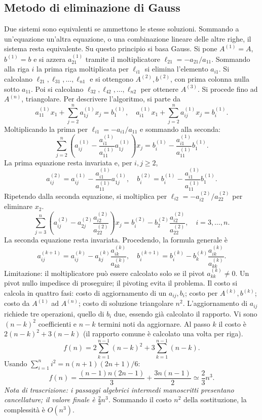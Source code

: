 \documentclass[11pt,a4paper]{article}
\newcommand{\pagina}[1]{\clearpage}
\begin{document}
\subsection*{Metodo di eliminazione di Gauss}
Due sistemi sono equivalenti se ammettono le stesse soluzioni. Sommando a un'equazione un'altra equazione, o una combinazione lineare delle altre righe, il sistema resta equivalente. Su questo principio si basa Gauss.
Si pone $A^{(1)}=A$, $b^{(1)}=b$ e si azzera $a_{21}^{(1)}$ tramite il moltiplicatore $\ell_{21}=-a_{21}/a_{11}$. Sommando alla riga $i$ la prima riga moltiplicata per $\ell_{i1}$ si elimina l'elemento $a_{i1}$. Si calcolano $\ell_{21},\ell_{31},\ldots,\ell_{n1}$ e si ottengono $A^{(2)},b^{(2)}$, con prima colonna nulla sotto $a_{11}$. Poi si calcolano $\ell_{32},\ell_{42},\ldots,\ell_{n2}$ per ottenere $A^{(3)}$.
\pagina{21}
Si procede fino ad $A^{(n)}$, triangolare. Per descrivere l'algoritmo, si parte da
\[a_{11}^{(1)}x_1+\sum_{j=2}^n a_{1j}^{(1)}x_j=b_1^{(1)},\quad a_{i1}^{(1)}x_1+\sum_{j=2}^n a_{ij}^{(1)}x_j=b_i^{(1)}.\]
Moltiplicando la prima per $\ell_{i1}=-a_{i1}/a_{11}$ e sommando alla seconda:
\[\sum_{j=2}^n\left(a_{ij}^{(1)}-\frac{a_{i1}^{(1)}}{a_{11}^{(1)}}a_{1j}^{(1)}\right)x_j=b_i^{(1)}-\frac{a_{i1}^{(1)}}{a_{11}^{(1)}}b_1^{(1)}.\]
La prima equazione resta invariata e, per $i,j\ge2$,
\[a_{ij}^{(2)}=a_{ij}^{(1)}-\frac{a_{i1}^{(1)}}{a_{11}^{(1)}}a_{1j}^{(1)},\quad b_i^{(2)}=b_i^{(1)}-\frac{a_{i1}^{(1)}}{a_{11}^{(1)}}b_1^{(1)}.\]
Ripetendo dalla seconda equazione, si moltiplica per $\ell_{i2}=-a_{i2}^{(2)}/a_{22}^{(2)}$ per eliminare $x_2$.
\pagina{22}
\[\sum_{j=3}^n\left(a_{ij}^{(2)}-a_{2j}^{(2)}\frac{a_{i2}^{(2)}}{a_{22}^{(2)}}\right)x_j=b_i^{(2)}-b_2^{(2)}\frac{a_{i2}^{(2)}}{a_{22}^{(2)}},\quad i=3,\ldots,n.\]
La seconda equazione resta invariata. Procedendo, la formula generale è
\[a_{ij}^{(k+1)}=a_{ij}^{(k)}-a_{kj}^{(k)}\frac{a_{ik}^{(k)}}{a_{kk}^{(k)}},\quad b_i^{(k+1)}=b_i^{(k)}-b_k^{(k)}\frac{a_{ik}^{(k)}}{a_{kk}^{(k)}}.\]
Limitazione: il moltiplicatore può essere calcolato solo se il pivot $a_{kk}^{(k)}\ne0$. Un pivot nullo impedisce di proseguire; il pivoting evita il problema.
Il costo si calcola in quattro fasi: costo di aggiornamento di un $a_{ij},b_i$; costo per $A^{(k)},b^{(k)}$; costo da $A^{(1)}$ ad $A^{(n)}$; costo di soluzione triangolare $n^2$. L'aggiornamento di $a_{ij}$ richiede tre operazioni, quello di $b_i$ due, essendo già calcolato il rapporto.
\pagina{23}
Vi sono $(n-k)^2$ coefficienti e $n-k$ termini noti da aggiornare. Al passo $k$ il costo è $2(n-k)^2+3(n-k)$ (il rapporto comune è calcolato una volta per riga).
\[f(n)=2\sum_{k=1}^{n-1}(n-k)^2+3\sum_{k=1}^{n-1}(n-k).\]
Usando $\sum_{i=1}^n i^2=n(n+1)(2n+1)/6$:
\[f(n)=\frac{(n-1)n(2n-1)}3+\frac{3n(n-1)}2\simeq\frac23n^3.\]
\textit{Nota di trascrizione: i passaggi algebrici intermedi manoscritti presentano cancellature; il valore finale è $\frac23n^3$.}
Sommando il costo $n^2$ della sostituzione, la complessità è $O(n^3)$.
\end{document}
